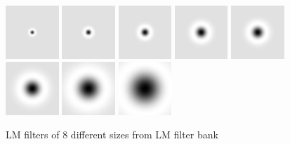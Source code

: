 \begin{figure}[!htb]
\includegraphics[width=2.0cm]{figs/lmf1.png}
\includegraphics[width=2.0cm]{figs/lmf3.png}
\includegraphics[width=2.0cm]{figs/lmf5.png}
\includegraphics[width=2.0cm]{figs/lmf7.png}
\includegraphics[width=2.0cm]{figs/lmf2.png}
\includegraphics[width=2.0cm]{figs/lmf4.png}
\includegraphics[width=2.0cm]{figs/lmf6.png}
\includegraphics[width=2.0cm]{figs/lmf8.png}
\caption{LM filters of 8 different sizes from LM filter bank}
\label{fig:log_filters8}
\end{figure}



